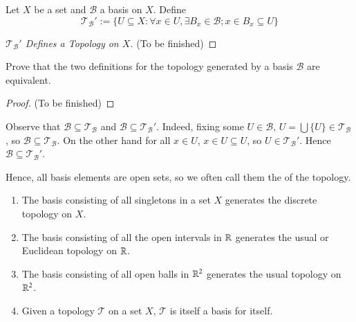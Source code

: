 \documentclass[12pt, a4paper, oneside, openright, titlepage]{book}
\begin{document}
\begin{definition}
    Let $X$ be a set and $\mathcal{B}$ a basis on $X$. Define \begin{equation*}
        \mathcal{T}_{\mathcal{B}}' := \{U\subseteq X:\forall x \in U,\exists B_x \in \mathcal{B};x \in B_x \subseteq U\}
    \end{equation*}
\end{definition}
\begin{proof}[$\mathcal{T}_{\mathcal{B}}'$ Defines a Topology on $X$]
    (To be finished)
\end{proof}


\begin{exercise}
    Prove that the two definitions for the topology generated by a basis $\mathcal{B}$ are equivalent. 
\end{exercise}
\begin{proof}
    (To be finished)
\end{proof}


\begin{remark}
    Observe that $\mathcal{B} \subseteq \mathcal{T}_{\mathcal{B}}$ and $\mathcal{B} \subseteq \mathcal{T}_{\mathcal{B}}'$. Indeed, fixing some $U \in \mathcal{B}$, $U = \bigcup\{U\} \in \mathcal{T}_{\mathcal{B}}$, so $\mathcal{B} \subseteq \mathcal{T}_{\mathcal{B}}$. On the other hand for all $x \in U$, $x \in U \subseteq U$, so $U \in \mathcal{T}_{\mathcal{B}}'$. Hence $\mathcal{B}\subseteq \mathcal{T}_{\mathcal{B}}'$.

    Hence, all basis elements are open sets, so we often call them the  of the topology.
\end{remark}

\begin{example}
    \leavevmode
    \begin{enumerate}
        \item The basis consisting of all singletons in a set $X$ generates the discrete topology on $X$.
        \item The basis consisting of all the open intervals in $\mathbb R$ generates the usual or Euclidean topology on $\mathbb R$.
        \item The basis consisting of all open balls in $\mathbb R^2$ generates the usual topology on $\mathbb R^2$.
        \item Given a topology $\mathcal{T}$ on a set $X$, $\mathcal{T}$ is itself a basis for itself.
    \end{enumerate}
\end{example}
\end{document}
